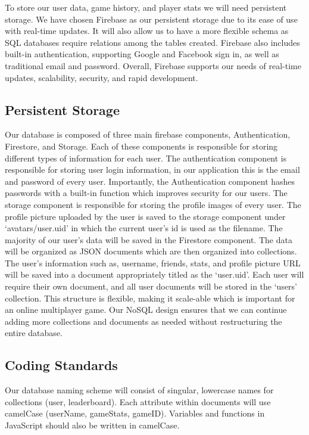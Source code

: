 \documentclass[12pt]{article} %
\begin{document}
To store our user data, game history, and player stats we will need persistent storage. We have chosen Firebase as our persistent storage due to its ease of use with real-time updates. It will also allow us to have a more flexible schema as SQL databases require relations among the tables created. Firebase also includes built-in authentication, supporting Google and Facebook sign in, as well as traditional email and password. Overall, Firebase supports our needs of real-time updates, scalability, security, and rapid development. 

\subsection{Persistent Storage}
Our database is composed of three main firebase components, Authentication, Firestore, and Storage. Each of these components is responsible for storing different types of information for each user. The authentication component is responsible for storing user login information, in our application this is the email and password of every user. Importantly, the Authentication component hashes passwords with a built-in function which improves security for our users. The storage component is responsible for storing the profile images of every user. The profile picture uploaded by the user is saved to the storage component under `avatars/user.uid' in which the current user's id is used as the filename. The majority of our user's data will be saved in the Firestore component. The data will be organized as JSON documents which are then organized into collections. The user's information such as, username, friends, stats, and profile picture URL will be saved into a document appropriately titled as the `user.uid'. Each user will require their own document, and all user documents will be stored in the `users' collection. This structure is flexible, making it scale-able which is important for an online multiplayer game. Our NoSQL design ensures that we can continue adding more collections and documents as needed without restructuring the entire database.

\subsection{Coding Standards}
Our database naming scheme will consist of singular, lowercase names for collections (user, leaderboard). Each attribute within documents will use camelCase (userName, gameStats, gameID). Variables and functions in JavaScript should also be written in camelCase. 
\end{document}
